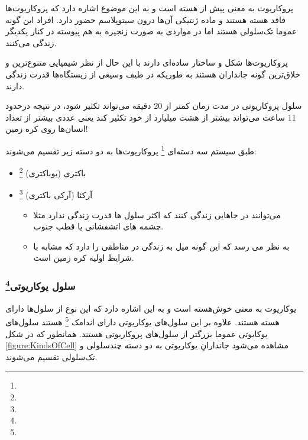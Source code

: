 پروکاریوت به معنی پیش از هسته است و به این موضوع اشاره دارد که پروکاریوت‌ها فاقد هسته هستند و ماده ژنتیکی آن‌ها درون سیتوپلاسم حضور دارد. افراد این گونه عموما تک‌سلولی هستند اما در مواردی به صورت زنجیره به هم پیوسته در کنار یکدیگر زندگی می‌کنند. 

پروکاریوت‌ها شکل و ساختار ساده‌ای دارند با این حال از نظر شیمیایی متنوع‌ترین و خلاق‌ترین گونه جانداران هستند به طوریکه در طیف وسیعی از زیستگاه‌ها قدرت زندگی دارند.

\noindent
سلول پروکاریوتی در مدت زمان کمتر از 20 دقیقه می‌تواند تکثیر شود، در نتیجه درحدود 11 ساعت می‌تواند بیشتر از هشت میلیارد از خود تکثیر کند یعنی عددی بیشتر از تعداد انسان‌ها روی کره زمین!

\noindent
طبق سیستم ‌سه ‌دسته‌ای
\footnote{}
پروکاریوت‌ها به دو دسته زیر تقسیم می‌شوند:

\begin{itemize}
\item باکتری (یوباکتری)
\footnote{}
\item آرکئا (آرکی باکتری) 
\footnote{}
	\begin{itemize}
	\item
	می‌توانند در جاهایی زندگی کنند که اکثر سلول ها قدرت زندگی ندارد مثلا چشمه های اتشفشانی یا قطب جنوب.
	\item
	به نظر می رسد که این گونه میل به زندگی در مناطقی را دارد که مشابه با شرایط اولیه کره زمین است. 	
	\end{itemize}
\end{itemize}

\subsubsection{سلول یوکاریوتی\protect\footnote{}}

یوکاریوت به معنی خوش‌هسته است و به این اشاره دارد که این نوع از سلول‌ها دارای هسته هستند. علاوه بر این سلول‌های یوکاریوتی دارای اندامک
\footnote{}
هستند
سلول‌های یوکایوتی عموما بزرگتر از سلول‌های پروکاریوتی هستند.
همانطور که در شکل
\ref{figure:KindsOfCell}
مشاهده می‌شود جاندارانِ یوکاریوتی به دو دسته چند‌سلولی و تک‌سلولی تقسیم می‌شوند.
\pagebreak

